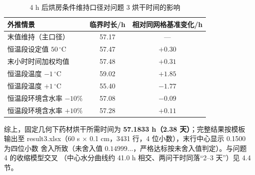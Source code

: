 \begin{table}[htbp]
  \centering
  \caption{4 h 后烘房条件维持口径对问题 3 烘干时间的影响}
  \label{tab:scen3}
  \begin{tabular}{lcc}
    \hline
    外推情景 & 临界时长/h & 相对同网格基准变化/h \\
    \hline
    末值维持（主口径） & 57.17 & — \\
    恒温段设定值 $50\,^{\circ}\mathrm{C}$ & 57.47 & $+0.30$ \\
    末小时时间加权均值 & 57.48 & $+0.31$ \\
    恒温段温度 $-1\,^{\circ}\mathrm{C}$ & 59.02 & $+1.85$ \\
    恒温段温度 $+1\,^{\circ}\mathrm{C}$ & 55.40 & $-1.77$ \\
    恒温段环境含水率 $-10\%$ & 57.08 & $-0.09$ \\
    恒温段环境含水率 $+10\%$ & 57.28 & $+0.11$ \\
    \hline
  \end{tabular}
\end{table}

综上，固定几何下药材烘干所需时间为 \textbf{57.1833 h（2.38 天）}；完整结果按模板输出至
result3.xlsx（60 s $\times$ 0.1 cm，3431 行，4 位小数），末行中心显示 0.1500 为四位小数
舍入所致（未舍入值 $0.14999\ldots$，严格达标按未舍入值判定）。与问题 4 的收缩模型交叉
（中心水分曲线约 41.0 h 相交、两问干时同落“2–3 天”）见 4.4 节。
